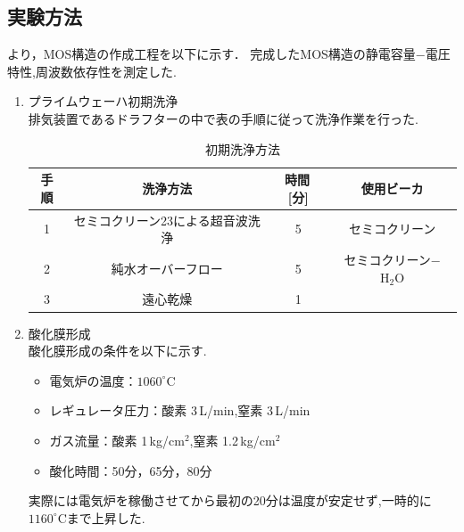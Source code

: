 \documentclass[11pt]{jarticle}
\begin{document}
	\subsection{実験方法}
		\cite{ref:指導書}より，MOS構造の作成工程を以下に示す．
		完成したMOS構造の静電容量−電圧特性,周波数依存性を測定した.
		\begin{enumerate}
			\item プライムウェーハ初期洗浄\\
				排気装置であるドラフターの中で表の手順に従って洗浄作業を行った.
				\begin{table}[H]
				\begin{center}
				\caption{初期洗浄方法}
				\label{tab:wash}
				\begin{tabular}{c|ccc} \toprule
					手順&洗浄方法&時間\,[分]&使用ビーカ\\ \hline
					1&セミコクリーン23による超音波洗浄&5&セミコクリーン\\
					2&純水オーバーフロー&5&セミコクリーン−$\mathrm{H_{2}O}$\\
					3&遠心乾燥&1&\\ \bottomrule
				\end{tabular}
				\end{center}
				\end{table}

			\item 酸化膜形成\\
				酸化膜形成の条件を以下に示す.
				\begin{itemize}
					\item 電気炉の温度：$1060^\circ \mathrm{C}$
					\item レギュレータ圧力：酸素 3\,L/min,窒素 3\,L/min
					\item ガス流量：酸素 1\,kg/$\mathrm{cm^{2}}$,窒素 1.2\,kg/$\mathrm{cm^{2}}$
					\item 酸化時間：50分，65分，80分
				\end{itemize}
				実際には電気炉を稼働させてから最初の20分は温度が安定せず,一時的に$1160^\circ \mathrm{C}$まで上昇した.


\end{enumerate}
\end{document}
